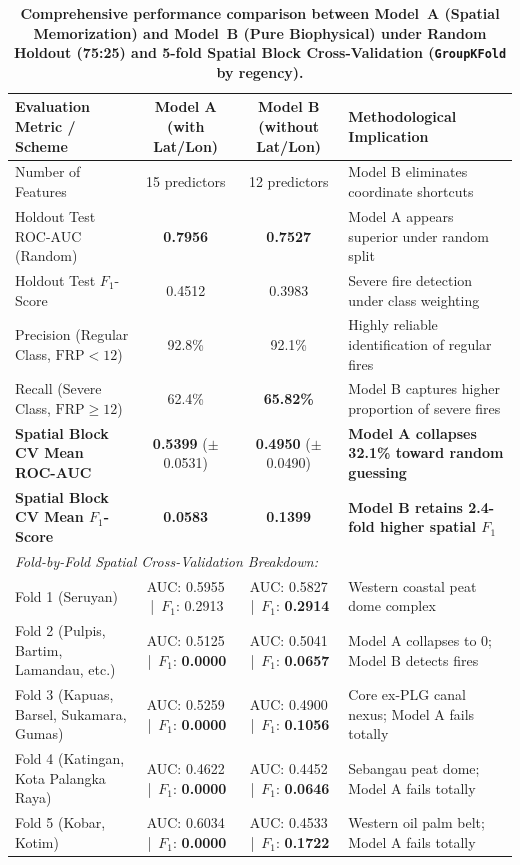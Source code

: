 \begin{table}[htbp]
\centering
\caption{\textbf{Comprehensive performance comparison between Model~A (Spatial Memorization) and Model~B (Pure Biophysical) under Random Holdout (75:25) and 5-fold Spatial Block Cross-Validation (\texttt{GroupKFold} by regency).}}
\label{tab:model_comparison}
\small
\begin{tabular}{lccp{5.5cm}}
\toprule
\textbf{Evaluation Metric / Scheme} & \textbf{Model A (with Lat/Lon)} & \textbf{Model B (without Lat/Lon)} & \textbf{Methodological Implication} \\
\midrule
Number of Features & 15 predictors & 12 predictors & Model B eliminates coordinate shortcuts \\
Holdout Test ROC-AUC (Random) & \textbf{0.7956} & \textbf{0.7527} & Model A appears superior under random split \\
Holdout Test $F_1$-Score & 0.4512 & 0.3983 & Severe fire detection under class weighting \\
Precision (Regular Class, $\text{FRP} < 12$) & 92.8\% & 92.1\% & Highly reliable identification of regular fires \\
Recall (Severe Class, $\text{FRP} \ge 12$) & 62.4\% & \textbf{65.82\%} & Model B captures higher proportion of severe fires \\
\midrule
\textbf{Spatial Block CV Mean ROC-AUC} & \textbf{0.5399} ($\pm$0.0531) & \textbf{0.4950} ($\pm$0.0490) & \textbf{Model A collapses 32.1\% toward random guessing} \\
\textbf{Spatial Block CV Mean $F_1$-Score} & \textbf{0.0583} & \textbf{0.1399} & \textbf{Model B retains 2.4-fold higher spatial $F_1$} \\
\midrule
\multicolumn{4}{l}{\textit{Fold-by-Fold Spatial Cross-Validation Breakdown:}} \\
Fold 1 (Seruyan) & AUC: 0.5955 \,|\, $F_1$: 0.2913 & AUC: 0.5827 \,|\, $F_1$: \textbf{0.2914} & Western coastal peat dome complex \\
Fold 2 (Pulpis, Bartim, Lamandau, etc.) & AUC: 0.5125 \,|\, $F_1$: \textbf{0.0000} & AUC: 0.5041 \,|\, $F_1$: \textbf{0.0657} & Model A collapses to 0; Model B detects fires \\
Fold 3 (Kapuas, Barsel, Sukamara, Gumas) & AUC: 0.5259 \,|\, $F_1$: \textbf{0.0000} & AUC: 0.4900 \,|\, $F_1$: \textbf{0.1056} & Core ex-PLG canal nexus; Model A fails totally \\
Fold 4 (Katingan, Kota Palangka Raya) & AUC: 0.4622 \,|\, $F_1$: \textbf{0.0000} & AUC: 0.4452 \,|\, $F_1$: \textbf{0.0646} & Sebangau peat dome; Model A fails totally \\
Fold 5 (Kobar, Kotim) & AUC: 0.6034 \,|\, $F_1$: \textbf{0.0000} & AUC: 0.4533 \,|\, $F_1$: \textbf{0.1722} & Western oil palm belt; Model A fails totally \\
\bottomrule
\end{tabular}
\end{table}

